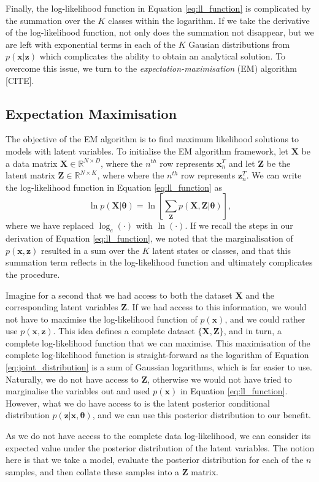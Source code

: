 \documentclass{article}
\begin{document}
Finally, the log-likelihood function in Equation \eqref{eq:ll_function} is complicated by the summation over the $K$ classes within the logarithm. If we take the derivative of the log-likelihood function, not only does the summation not disappear, but we are left with exponential terms in each of the $K$ Gausian distributions from $p(\mathbf{x}\vert\mathbf{z})$ which complicates the ability to obtain an analytical solution. To overcome this issue, we turn to the \emph{expectation-maximisation} (EM) algorithm [CITE].

\subsection{Expectation Maximisation}

The objective of the EM algorithm is to find maximum likelihood solutions to models with latent variables. To initialise the EM algorithm framework, let $\mathbf{X}$ be a data matrix $\mathbf{X}\in \mathbb{R}^{N \times D}$, where the $n^{th}$ row represents $\mathbf{x}_n^T$ and let $\mathbf{Z}$ be the latent matrix $\mathbf{Z}\in \mathbb{R}^{N \times K}$, where where the $n^{th}$ row represents $\mathbf{z}_n^T$. We can write the log-likelihood function in Equation \eqref{eq:ll_function} as
\begin{equation}
\ln p(\mathbf{X}\vert \boldsymbol\theta) = \ln \left[ \sum_{\mathbf{Z}} p(\mathbf{X}, \mathbf{Z}\vert \boldsymbol\theta) \right],
\end{equation}
where we have replaced $\log_e(\cdot)$ with $\ln(\cdot)$. If we recall the steps in our derivation of Equation \eqref{eq:ll_function}, we noted that the marginalisation of $p(\mathbf{x}, \mathbf{z})$ resulted in a sum over the $K$ latent states or classes, and that this summation term reflects in the log-likelihood function and ultimately complicates the procedure. 

Imagine for a second that we had access to both the dataset $\mathbf{X}$ and the corresponding latent variables $\mathbf{Z}$. If we had access to this information, we would not have to maximise the log-likelihood function of $p(\mathbf{x})$, and we could rather use $p(\mathbf{x}, \mathbf{z})$. This idea defines a complete dataset $\{\mathbf{X}, \mathbf{Z}\}$, and in turn, a complete log-likelihood function that we can maximise. This maximisation of the complete log-likelihood function is straight-forward as the logarithm of Equation \eqref{eq:joint_distribution} is a sum of Gaussian logarithms, which is far easier to use. Naturally, we do not have access to $\mathbf{Z}$, otherwise we would not have tried to marginalise the variables out and used $p(\mathbf{x})$ in Equation \eqref{eq:ll_function}. However, what we do have access to is the latent posterior conditional distribution $p(\mathbf{z}\vert\mathbf{x}, \boldsymbol\theta)$, and we can use this posterior distribution to our benefit. 

As we do not have access to the complete data log-likelihood, we can consider its expected value under the posterior distribution of the latent variables. The notion here is that we take a model, evaluate the posterior distribution for each of the $n$ samples, and then collate these samples into a $\mathbf{Z}$ matrix. 
\end{document}
